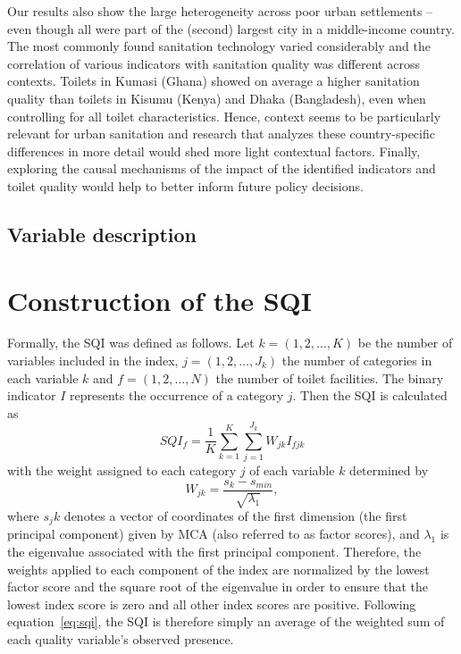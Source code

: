 \documentclass[natbib]{svjour3}                     %
\begin{document}
Our results also show the large heterogeneity across poor urban settlements -- even though all were part of the (second) largest city in a middle-income country. The most commonly found sanitation technology varied considerably and the correlation of various indicators with sanitation quality was different across contexts. Toilets in Kumasi (Ghana) showed on average a higher sanitation quality than toilets in Kisumu (Kenya) and Dhaka (Bangladesh), even when controlling for all toilet characteristics. Hence, context seems to be particularly relevant for urban sanitation and research that analyzes these country-specific differences in more detail would shed more light contextual factors. Finally, exploring the causal mechanisms of the impact of the identified indicators and toilet quality would help to better inform future policy decisions. 


\clearpage



\clearpage
\appendix
\begin{landscape}
\section{Variable description}
\label{sec:variables}



\end{landscape}
\section{Construction of the SQI}
\label{sec:sqi}
Formally, the SQI was defined as follows. Let $k=(1,2,\dots,K)$ be the number of variables included in the index, $j=(1,2,\dots,J_k)$ the number of categories in each variable $k$ and $f=(1,2,\dots,N)$ the number of toilet facilities. The binary indicator $I$ represents the occurrence of a category $j$. Then the SQI is calculated as
\begin{equation}
\label{eq:sqi}
    SQI_f = \frac{1}{K} \sum_{k=1}^{K} \sum_{j=1}^{J_k} W_{jk} I_{fjk}
\end{equation}
with the weight assigned to each category $j$ of each variable $k$ determined by
\begin{equation}
    W_{jk} = \frac{s_k - s_{min}}{\sqrt{\lambda_1}},
\end{equation}
where $s_jk$ denotes a vector of coordinates of the first dimension (the first principal component) given by MCA (also referred to as factor scores), and $\lambda_1$ is the eigenvalue associated with the first principal component. Therefore, the weights applied to each component of the index are normalized by the lowest factor score and the square root of the eigenvalue in order to ensure that the lowest index score is zero and all other index scores are positive. Following equation~\ref{eq:sqi}, the SQI is therefore simply an average of the weighted sum of each quality variable's observed presence. 
\end{document}
